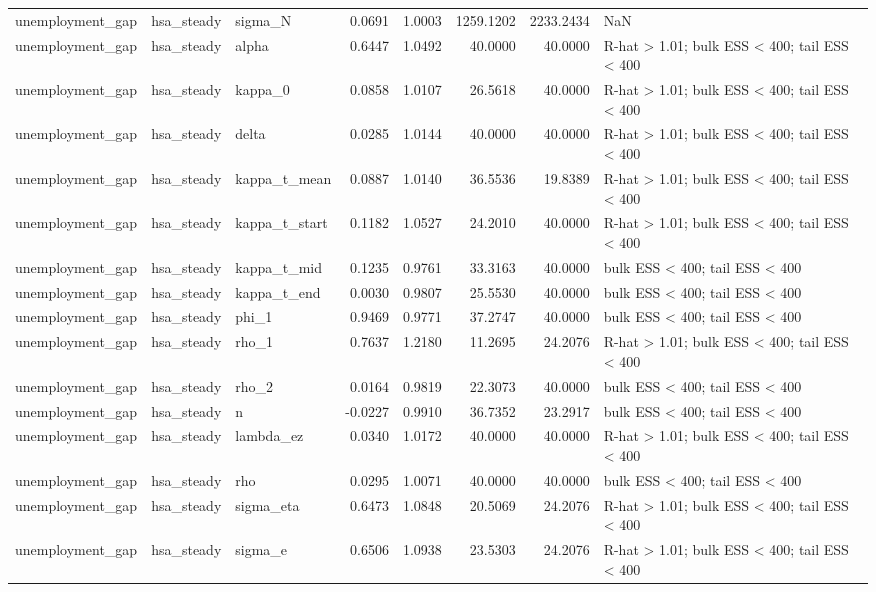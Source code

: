\begin{tabular}{lllrrrrl}
unemployment\_gap & hsa\_steady & sigma\_N & 0.0691 & 1.0003 & 1259.1202 & 2233.2434 & NaN \\
unemployment\_gap & hsa\_steady & alpha & 0.6447 & 1.0492 & 40.0000 & 40.0000 & R-hat > 1.01; bulk ESS < 400; tail ESS < 400 \\
unemployment\_gap & hsa\_steady & kappa\_0 & 0.0858 & 1.0107 & 26.5618 & 40.0000 & R-hat > 1.01; bulk ESS < 400; tail ESS < 400 \\
unemployment\_gap & hsa\_steady & delta & 0.0285 & 1.0144 & 40.0000 & 40.0000 & R-hat > 1.01; bulk ESS < 400; tail ESS < 400 \\
unemployment\_gap & hsa\_steady & kappa\_t\_mean & 0.0887 & 1.0140 & 36.5536 & 19.8389 & R-hat > 1.01; bulk ESS < 400; tail ESS < 400 \\
unemployment\_gap & hsa\_steady & kappa\_t\_start & 0.1182 & 1.0527 & 24.2010 & 40.0000 & R-hat > 1.01; bulk ESS < 400; tail ESS < 400 \\
unemployment\_gap & hsa\_steady & kappa\_t\_mid & 0.1235 & 0.9761 & 33.3163 & 40.0000 & bulk ESS < 400; tail ESS < 400 \\
unemployment\_gap & hsa\_steady & kappa\_t\_end & 0.0030 & 0.9807 & 25.5530 & 40.0000 & bulk ESS < 400; tail ESS < 400 \\
unemployment\_gap & hsa\_steady & phi\_1 & 0.9469 & 0.9771 & 37.2747 & 40.0000 & bulk ESS < 400; tail ESS < 400 \\
unemployment\_gap & hsa\_steady & rho\_1 & 0.7637 & 1.2180 & 11.2695 & 24.2076 & R-hat > 1.01; bulk ESS < 400; tail ESS < 400 \\
unemployment\_gap & hsa\_steady & rho\_2 & 0.0164 & 0.9819 & 22.3073 & 40.0000 & bulk ESS < 400; tail ESS < 400 \\
unemployment\_gap & hsa\_steady & n & -0.0227 & 0.9910 & 36.7352 & 23.2917 & bulk ESS < 400; tail ESS < 400 \\
unemployment\_gap & hsa\_steady & lambda\_ez & 0.0340 & 1.0172 & 40.0000 & 40.0000 & R-hat > 1.01; bulk ESS < 400; tail ESS < 400 \\
unemployment\_gap & hsa\_steady & rho & 0.0295 & 1.0071 & 40.0000 & 40.0000 & bulk ESS < 400; tail ESS < 400 \\
unemployment\_gap & hsa\_steady & sigma\_eta & 0.6473 & 1.0848 & 20.5069 & 24.2076 & R-hat > 1.01; bulk ESS < 400; tail ESS < 400 \\
unemployment\_gap & hsa\_steady & sigma\_e & 0.6506 & 1.0938 & 23.5303 & 24.2076 & R-hat > 1.01; bulk ESS < 400; tail ESS < 400 \\

\end{tabular}
